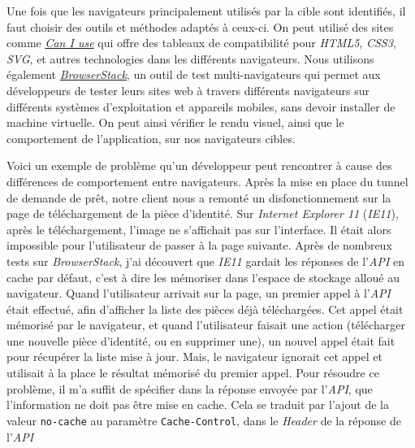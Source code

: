\documentclass[12pt,a4paper]{article}
\begin{document}
  Une fois que les navigateurs principalement utilisés par la cible sont
  identifiés, il faut choisir des outils et méthodes adaptés à ceux-ci. On
  peut utilisé des sites comme \href{http://caniuse.com/}{\emph{Can I
  use}} qui offre des tableaux de compatibilité pour \emph{HTML5},
  \emph{CSS3}, \emph{SVG}, et autres technologies dans les différents
  navigateurs. Nous utilisons également
  \href{https://www.browserstack.com/}{\emph{BrowserStack}}, un outil de
  test multi-navigateurs qui permet aux développeurs de tester leurs sites
  web à travers différents navigateurs sur différents systèmes
  d'exploitation et appareils mobiles, sans devoir installer de machine
  virtuelle. On peut ainsi vérifier le rendu visuel, ainsi que le
  comportement de l'application, sur nos navigateurs cibles.

  \bigskip

  Voici un exemple de problème qu'un développeur peut rencontrer à cause
  des différences de comportement entre navigateurs. Après la mise en
  place du tunnel de demande de prêt, notre client nous a remonté un
  disfonctionnement sur la page de téléchargement de la pièce d'identité.
  Sur \emph{Internet Explorer 11} (\emph{IE11}), après le téléchargement,
  l'image ne s'affichait pas sur l'interface. Il était alors impossible
  pour l'utilisateur de passer à la page suivante. Après de nombreux tests
  sur \emph{BrowserStack}, j'ai découvert que \emph{IE11} gardait les
  réponses de l'\emph{API} en cache par défaut, c'est à dire les mémoriser
  dans l'espace de stockage alloué au navigateur. Quand l'utilisateur
  arrivait sur la page, un premier appel à l'\emph{API} était effectué,
  afin d'afficher la liste des pièces déjà téléchargées. Cet appel était
  mémorisé par le navigateur, et quand l'utilisateur faisait une action
  (télécharger une nouvelle pièce d'identité, ou en supprimer une), un
  nouvel appel était fait pour récupérer la liste mise à jour. Mais, le
  navigateur ignorait cet appel et utilisait à la place le résultat
  mémorisé du premier appel. Pour résoudre ce problème, il m'a suffit de
  spécifier dans la réponse envoyée par l'\emph{API}, que l'information ne
  doit pas être mise en cache. Cela se traduit par l'ajout de la valeur
  \texttt{no-cache} au paramètre \texttt{Cache-Control}, dans le
  \emph{Header} de la réponse de l'\emph{API}

  \bigskip
\end{document}
